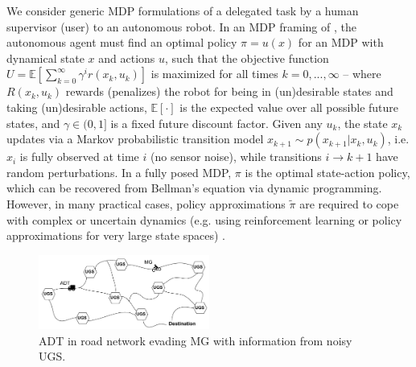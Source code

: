 We consider generic MDP formulations of a delegated task \task{} by a human supervisor (user) to an autonomous robot. In an MDP framing of \task{}, the autonomous agent must find an optimal policy $\pi = u(x)$ for an MDP with dynamical state $x$ and actions $u$, such that the objective function
$U = \mathbb{E} \left[\sum_{k=0}^{\infty} \gamma^i r(x_k,u_k) \right]$ is maximized for all times $k=0,...,\infty$ --  
where $R(x_k,u_k)$ rewards (penalizes) the robot for being in (un)desirable states and taking (un)desirable actions, $\mathbb{E}[\cdot]$ is the expected value over all possible future states, and $\gamma \in (0,1]$ is a fixed future discount factor. 
Given any $u_k$, the state $x_k$ updates via a Markov probabilistic transition model $x_{k+1} \sim p(x_{k+1}|x_{k},u_{k})$,  
i.e. $x_{i}$ is fully observed at time $i$ (no sensor noise), while transitions $i\rightarrow k+1$ have random perturbations.
In a fully posed MDP, $\pi$ is the optimal state-action policy, which can be recovered from Bellman's equation via dynamic programming. 
However, in many practical cases, policy approximations $\tilde{\pi}$ are required to cope with complex or uncertain dynamics (e.g. using reinforcement learning or policy approximations for very large state spaces) \cite{Kochenderfer2015-uu}. 
\begin{figure}[t]%
    	\centering
     	\includegraphics[width=0.5\textwidth]{Figures/RoadNet}
    	\caption{ADT in road network evading MG with information from noisy UGS. } 
        \label{fig:RoadNet}
        \vspace{-0.2cm}
\end{figure}    
    
